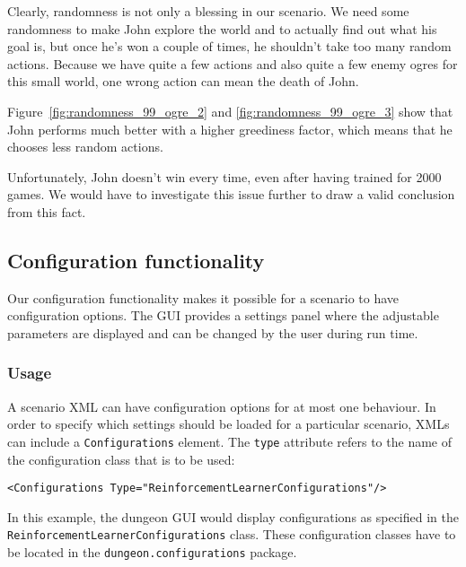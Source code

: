 \documentclass[a4paper,10pt]{scrartcl}
\begin{document}

Clearly, randomness is not only a blessing in our scenario. We need some randomness to make John explore the world and to actually find out what his goal is, but once he's won a couple of times, he shouldn't take too many random actions. Because we have quite a few actions and also quite a few enemy ogres for this small world, one wrong action can mean the death of John. 

Figure~\ref{fig:randomness_99_ogre_2} and \ref{fig:randomness_99_ogre_3} show that John performs much better with a higher greediness factor, which means that he chooses less random actions.

Unfortunately, John doesn't win every time, even after having trained for 2000 games. We would have to investigate this issue further to draw a valid conclusion from this fact. 

\subsection{Configuration functionality}
Our configuration functionality makes it possible for a scenario to have configuration options. The GUI provides a settings panel where the adjustable parameters are displayed and can be changed by the user during run time.

\subsubsection{Usage}
A scenario XML can have configuration options for at most one behaviour. In order to specify which settings should be loaded for a particular scenario, XMLs can include a \verb|Configurations| element. The \verb|type| attribute refers to the name of the configuration class that is to be used:
\begin{verbatim}
<Configurations Type="ReinforcementLearnerConfigurations"/>
\end{verbatim}
In this example, the dungeon GUI would display configurations as specified in the  \verb|ReinforcementLearnerConfigurations| class. These configuration classes have to be located in the \verb|dungeon.configurations| package.
\end{document}
